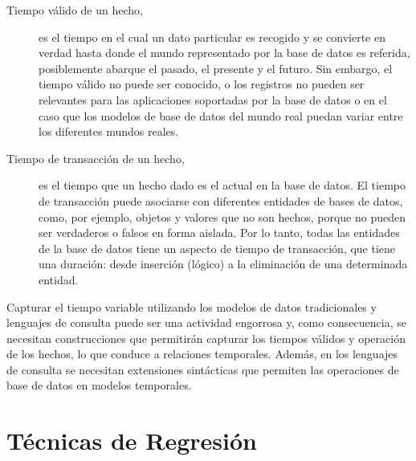 \begin{description}
 \item [Tiempo válido de un hecho,] es el tiempo en el cual un dato particular es recogido y se convierte en verdad
 hasta donde el mundo representado por la base de datos es referida, 
posiblemente abarque el pasado, el presente y el futuro. Sin embargo, el tiempo válido no puede ser 
conocido, o los registros no pueden ser relevantes para las aplicaciones soportadas por la base de datos
o en el caso que los modelos de base de datos del mundo real puedan variar entre los diferentes mundos reales.

\item [Tiempo de transacción de un hecho,] es el tiempo que un hecho dado es el actual en la base de datos. 
El tiempo de transacción puede asociarse con diferentes entidades de bases de datos, como, por ejemplo,
objetos y valores que no son hechos, porque no pueden ser verdaderos o falsos en forma aislada. Por lo tanto, todas las entidades de la base de datos tiene un aspecto de tiempo de transacción, que tiene
una duración: desde inserción (lógico) a la eliminación de una determinada entidad.
\end{description}


Capturar el tiempo variable utilizando los modelos de datos tradicionales y lenguajes de consulta
puede ser una actividad engorrosa y, como consecuencia, se necesitan construcciones que permitirán
capturar los tiempos válidos y operación de los hechos, lo que conduce a relaciones temporales. Además,
en los lenguajes de consulta se necesitan extensiones sintácticas que permiten las operaciones de base
de datos en modelos temporales. \cite{yuzheng2011}

\section{Técnicas de Regresión}

